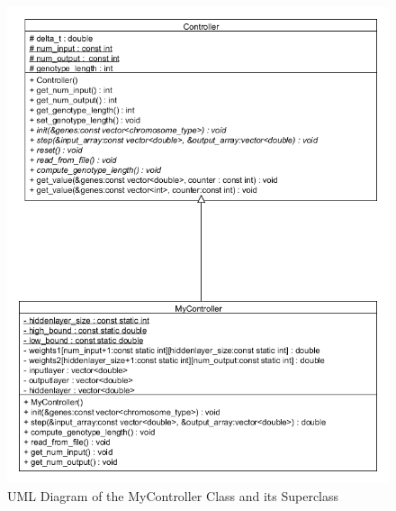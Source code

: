 \begin{figure}[h]
\centering
\includegraphics[scale=0.6]{Chapter2/images/controlle_uml.png}
\caption{UML Diagram of the MyController Class and its Superclass}
\label{fig:controller_uml}
\end{figure}

